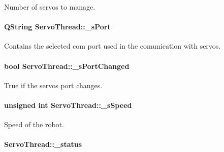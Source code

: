 Number of servos to manage. 

\hypertarget{a00009_ac9a614aa1518efb49b0a06636bd1bdbf}{}
\paragraph[{\+\_\+s\+Port}]{\setlength{\rightskip}{0pt plus 5cm}Q\+String Servo\+Thread\+::\+\_\+s\+Port\hspace{0.3cm}{\ttfamily [private]}}\label{a00009_ac9a614aa1518efb49b0a06636bd1bdbf}


Contains the selected com port used in the comunication with servos. 

\hypertarget{a00009_a6e803432db01b10ed975132315280fd3}{}
\paragraph[{\+\_\+s\+Port\+Changed}]{\setlength{\rightskip}{0pt plus 5cm}bool Servo\+Thread\+::\+\_\+s\+Port\+Changed\hspace{0.3cm}{\ttfamily [private]}}\label{a00009_a6e803432db01b10ed975132315280fd3}


True if the servos port changes. 

\hypertarget{a00009_a2591c704c80518be7abb1698364cab5e}{}
\paragraph[{\+\_\+s\+Speed}]{\setlength{\rightskip}{0pt plus 5cm}unsigned int Servo\+Thread\+::\+\_\+s\+Speed\hspace{0.3cm}{\ttfamily [private]}}\label{a00009_a2591c704c80518be7abb1698364cab5e}


Speed of the robot. 

\hypertarget{a00009_a8d2299f41165bffe1656df776f7f7528}{}
\paragraph[{\+\_\+status}]{ Servo\+Thread\+::\+\_\+status\hspace{0.3cm}{\ttfamily [private]}}\label{a00009_a8d2299f41165bffe1656df776f7f7528}



